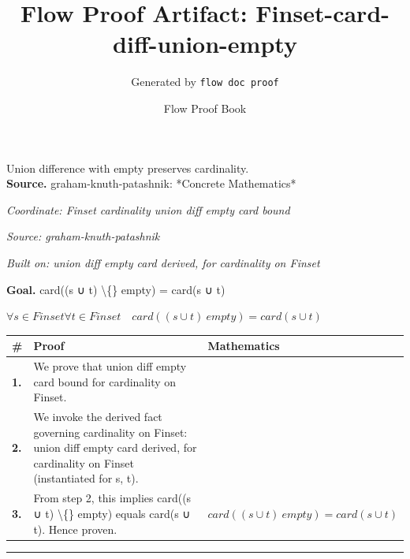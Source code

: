 \documentclass[11pt]{article}
\title{Flow Proof Artifact: Finset-card-diff-union-empty}
\author{Generated by \texttt{flow doc proof}}
\date{Flow Proof Book}
\theoremstyle{definition}
\begin{document}
\maketitle
Union difference with empty preserves cardinality.\\[0.5em]
\textbf{Source.} graham-knuth-patashnik: *Concrete Mathematics*\\[0.5em]
\bigskip
{}\par
\smallskip\noindent\textit{Coordinate: Finset \cdot cardinality \cdot union diff empty card bound}\par
\smallskip\noindent\textit{Source: graham-knuth-patashnik}\par
\smallskip\noindent\textit{Built on: union diff empty card derived, for cardinality on Finset}\par
\medskip
\noindent\textbf{Goal.} card((s ∪ t) \textbackslash\{\} empty) = card(s ∪ t)\par
\noindent$\displaystyle \forall s \in Finset \forall t \in Finset\quad card((s ∪ t) \ empty) = card(s ∪ t)$\par
\medskip
\noindent
\begin{tabular}{@{} >{\raggedright\arraybackslash}p{} >{\raggedright\arraybackslash}p{} >{\raggedleft\arraybackslash}p{} @{}}
\textbf{\#} & \textbf{Proof} & \textbf{Mathematics} \\
\midrule
\textbf{1.} & We prove that union diff empty card bound for cardinality on Finset. & \\[0.45em]
\textbf{2.} & We invoke the derived fact governing cardinality on Finset: union diff empty card derived, for cardinality on Finset (instantiated for s, t). & \\[0.45em]
\textbf{3.} & From step 2, this implies card((s ∪ t) \textbackslash\{\} empty) equals card(s ∪ t). Hence proven. & $\displaystyle card((s ∪ t) \ empty) = card(s ∪ t)$ \\[0.45em]
\bottomrule
\end{tabular}
\label{thm:Finset-cardinality-union_diff_empty_card_bound}
\par\medskip\hrule
\end{document}
